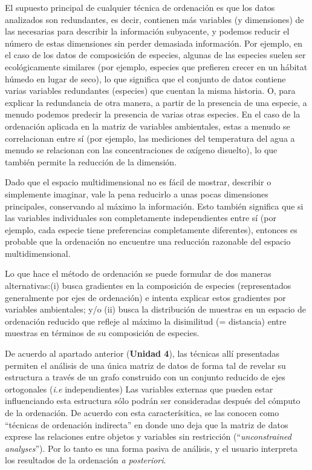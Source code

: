 \documentclass[
]{book}
\begin{document}
El supuesto principal de cualquier técnica de ordenación es que los datos analizados son redundantes, es decir, contienen más variables (y dimensiones) de las necesarias para describir la información subyacente, y podemos reducir el número de estas dimensiones sin perder demasiada información. Por ejemplo, en el caso de los datos de composición de especies, algunas de las especies suelen ser ecológicamente similares (por ejemplo, especies que prefieren crecer en un hábitat húmedo en lugar de seco), lo que significa que el conjunto de datos contiene varias variables redundantes (especies) que cuentan la misma historia. O, para explicar la redundancia de otra manera, a partir de la presencia de una especie, a menudo podemos predecir la presencia de varias otras especies. En el caso de la ordenación aplicada en la matriz de variables ambientales, estas a menudo se correlacionan entre sí (por ejemplo, las mediciones del temperatura del agua a menudo se relacionan con las concentraciones de oxígeno disuelto), lo que también permite la reducción de la dimensión.

Dado que el espacio multidimensional no es fácil de mostrar, describir o simplemente imaginar, vale la pena reducirlo a unas pocas dimensiones principales, conservando al máximo la información. Esto también significa que si las variables individuales son completamente independientes entre sí (por ejemplo, cada especie tiene preferencias completamente diferentes), entonces es probable que la ordenación no encuentre una reducción razonable del espacio multidimensional.

Lo que hace el método de ordenación se puede formular de dos maneras alternativas:(i) busca gradientes en la composición de especies (representados generalmente por ejes de ordenación) e intenta explicar estos gradientes por variables ambientales; y/o (ii) busca la distribución de muestras en un espacio de ordenación reducido que refleje al máximo la disimilitud (= distancia) entre muestras en términos de su composición de especies.

De acuerdo al apartado anterior (\textbf{Unidad 4}), las técnicas allí presentadas permiten el análisis de una única matriz de datos de forma tal de revelar su estructura a través de un grafo construido con un conjunto reducido de ejes ortogonales (\emph{i.e} independientes) Las variables externas que pueden estar influenciando esta estructura sólo podrán ser consideradas después del cómputo de la ordenación. De acuerdo con esta caracterísitica, se las conocen como ``técnicas de ordenación indirecta'' en donde uno deja que la matriz de datos exprese las relaciones entre objetos y variables sin restricción (``\emph{unconstrained analyses}''). Por lo tanto es una forma pasiva de análisis, y el usuario interpreta los resultados de la ordenación \emph{a posteriori}.
\end{document}
